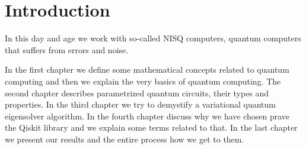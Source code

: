 \chapter*{Introduction}

In this day and age we work with so-called NISQ computers, quantum computers that suffers from errors and noise. 


In the first chapter we define some mathematical concepts related to quantum computing and then we explain the very basics of quantum computing. The second chapter describes parametrized quantum circuits, their types and properties. In the third chapter we try to demystify a variational quantum eigensolver algorithm. In the fourth chapter discuss why we have chosen prave the Qiskit library and we explain some terms related to that.  In the last chapter we present our results and the entire process how we get to them. 


